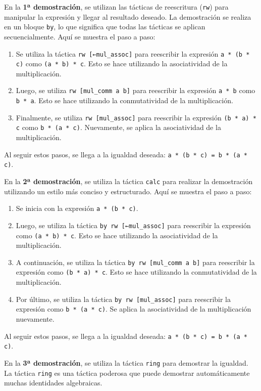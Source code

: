 En la \textbf{1ª demostración}, se utilizan las tácticas de reescritura (\texttt{rw})
para manipular la expresión y llegar al resultado deseado. La
demostración se realiza en un bloque \texttt{by}, lo que significa que todas
las tácticas se aplican secuencialmente. Aquí se muestra el paso a paso:
\begin{enumerate}
\item Se utiliza la táctica \texttt{rw [←mul\_assoc]} para reescribir la expresión
\texttt{a * (b * c)} como \texttt{(a * b) * c}. Esto se hace utilizando la
asociatividad de la multiplicación.
\item Luego, se utiliza \texttt{rw [mul\_comm a b]} para reescribir la expresión
\texttt{a * b} como \texttt{b * a}. Esto se hace utilizando la conmutatividad de la
multiplicación.
\item Finalmente, se utiliza \texttt{rw [mul\_assoc]} para reescribir la expresión
\texttt{(b * a) * c} como \texttt{b * (a * c)}. Nuevamente, se aplica la
asociatividad de la multiplicación.
\end{enumerate}

Al seguir estos pasos, se llega a la igualdad deseada:
\texttt{a * (b * c) = b * (a * c)}.

En la \textbf{2ª demostración}, se utiliza la táctica \texttt{calc} para realizar la
demostración utilizando un estilo más conciso y estructurado. Aquí se
muestra el paso a paso:
\begin{enumerate}
\item Se inicia con la expresión \texttt{a * (b * c)}.
\item Luego, se utiliza la táctica \texttt{by rw [←mul\_assoc]} para reescribir la
expresión como \texttt{(a * b) * c}. Esto se hace utilizando la
asociatividad de la multiplicación.
\item A continuación, se utiliza la táctica \texttt{by rw [mul\_comm a b]} para
reescribir la expresión como \texttt{(b * a) * c}. Esto se hace utilizando
la conmutatividad de la multiplicación.
\item Por último, se utiliza la táctica \texttt{by rw [mul\_assoc]} para reescribir
la expresión como \texttt{b * (a * c)}. Se aplica la asociatividad de la
multiplicación nuevamente.
\end{enumerate}

Al seguir estos pasos, se llega a la igualdad deseada:
\texttt{a * (b * c) = b * (a * c)}.

En la \textbf{3ª demostración}, se utiliza la táctica \texttt{ring} para demostrar la
igualdad. La táctica \texttt{ring} es una táctica poderosa que puede demostrar
automáticamente muchas identidades algebraicas.

